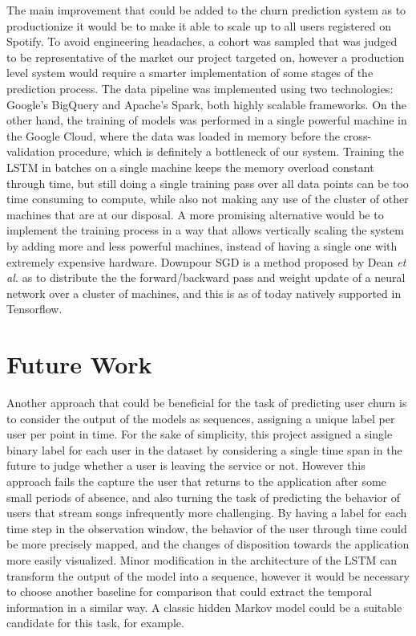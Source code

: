 \documentclass{kththesis}
\begin{document}
The main improvement that could be added to the churn prediction system as to productionize it would be to make it able to scale up to all users registered on Spotify. To avoid engineering headaches, a cohort was sampled that was judged to be representative of the market our project targeted on, however a production level system would require a smarter implementation of some stages of the prediction process. The data pipeline was implemented using two technologies: Google's BigQuery and Apache's Spark, both highly scalable frameworks. On the other hand, the training of models was performed in a single powerful machine in the Google Cloud, where the data was loaded in memory before the cross-validation procedure, which is definitely a bottleneck of our system. Training the LSTM in batches on a single machine keeps the memory overload constant through time, but still doing a single training pass over all data points can be too time consuming to compute, while also not making any use of the cluster of other machines that are at our disposal. A more promising alternative would be to implement the training process in a way that allows vertically scaling the system by adding more and less powerful machines, instead of having a single one with extremely expensive hardware. Downpour SGD is a method proposed by Dean \emph{et al.} \citep{dean2012large} as to distribute the the forward/backward pass and weight update of a neural network over a cluster of machines, and this is as of today natively supported in Tensorflow.

\section{Future Work}

Another approach that could be beneficial for the task of predicting user churn is to consider the output of the models as sequences, assigning a unique label per user per point in time. For the sake of simplicity, this project assigned a single binary label for each user in the dataset by considering a single time span in the future to judge whether a user is leaving the service or not. However this approach fails the capture the user that returns to the application after some small periods of absence, and also turning the task of predicting the behavior of users that stream songs infrequently more challenging. By having a label for each time step in the observation window, the behavior of the user through time could be more precisely mapped, and the changes of disposition towards the application more easily visualized. Minor modification in the architecture of the LSTM can transform the output of the model into a sequence, however it would be necessary to choose another baseline for comparison that could extract the temporal information in a similar way. A classic hidden Markov model could be a suitable candidate for this task, for example. 
\end{document}
